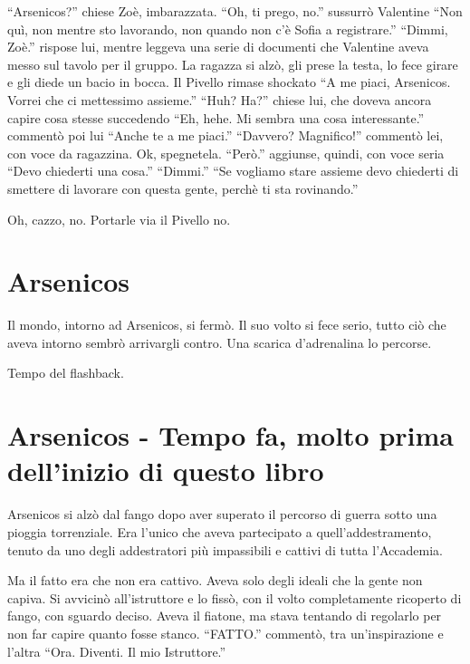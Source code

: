     ``Arsenicos?'' chiese Zoè, imbarazzata. ``Oh, ti prego, no.'' sussurrò Valentine ``Non quì, non mentre sto
    lavorando, non quando non c'è Sofia a registrare.'' ``Dimmi, Zoè.'' rispose lui, mentre leggeva una serie di
    documenti che Valentine aveva messo sul tavolo per il gruppo. La ragazza si alzò, gli prese la testa, lo fece girare
    e gli diede un bacio in bocca. Il Pivello rimase shockato ``A me piaci, Arsenicos. Vorrei che ci mettessimo
    assieme.'' ``Huh? Ha?'' chiese lui, che doveva ancora capire cosa stesse succedendo ``Eh, hehe. Mi sembra una cosa
    interessante.'' commentò poi lui ``Anche te a me piaci.'' ``Davvero? Magnifico!'' commentò lei, con voce da
    ragazzina. Ok, spegnetela. ``Però.'' aggiunse, quindi, con voce seria ``Devo chiederti una cosa.'' ``Dimmi.'' ``Se
    vogliamo stare assieme devo chiederti di smettere di lavorare con questa gente, perchè ti sta rovinando.''

    Oh, cazzo, no. Portarle via il Pivello no.

  \section*{Arsenicos}

    Il mondo, intorno ad Arsenicos, si fermò. Il suo volto si fece serio, tutto ciò che aveva intorno sembrò arrivargli
    contro. Una scarica d'adrenalina lo percorse.

    Tempo del flashback.

  \section*{Arsenicos - Tempo fa, molto prima dell'inizio di questo libro}

    Arsenicos si alzò dal fango dopo aver superato il percorso di guerra sotto una pioggia torrenziale. Era l'unico che
    aveva partecipato a quell'addestramento, tenuto da uno degli addestratori più impassibili e cattivi di tutta
    l'Accademia.

    Ma il fatto era che non era cattivo. Aveva solo degli ideali che la gente non capiva. Si avvicinò all'istruttore e
    lo fissò, con il volto completamente ricoperto di fango, con sguardo deciso. Aveva il fiatone, ma stava tentando di
    regolarlo per non far capire quanto fosse stanco. ``FATTO.'' commentò, tra un'inspirazione e l'altra ``Ora. Diventi.
    Il mio Istruttore.''

